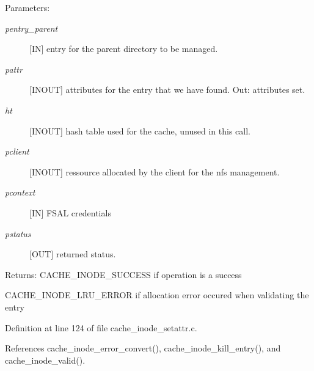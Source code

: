 \begin{Desc}
\item[Parameters:]
\begin{description}
\item[{\em pentry\_\-parent}][IN] entry for the parent directory to be managed. \item[{\em pattr}][INOUT] attributes for the entry that we have found. Out: attributes set. \item[{\em ht}][INOUT] hash table used for the cache, unused in this call. \item[{\em pclient}][INOUT] ressource allocated by the client for the nfs management. \item[{\em pcontext}][IN] FSAL credentials \item[{\em pstatus}][OUT] returned status.\end{description}
\end{Desc}
\begin{Desc}
\item[Returns:]CACHE\_\-INODE\_\-SUCCESS if operation is a success \par
 

CACHE\_\-INODE\_\-LRU\_\-ERROR if allocation error occured when validating the entry \end{Desc}


Definition at line 124 of file cache\_\-inode\_\-setattr.c.

References cache\_\-inode\_\-error\_\-convert(), cache\_\-inode\_\-kill\_\-entry(), and cache\_\-inode\_\-valid().